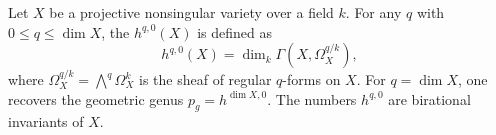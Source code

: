 Let $X$ be a projective nonsingular variety over a field $k$. For any $q$ with $0 \leq q \leq \dim X$, the  $h^{q,0}(X)$ is defined as
$$h^{q,0}(X) = \dim_k \Gamma(X, \Omega_X^{q/k}),$$
where $\Omega_X^{q/k} = \bigwedge^q \Omega_X^{k}$ is the sheaf of regular $q$-forms on $X$. For $q = \dim X$, one recovers the geometric genus $p_g = h^{\dim X, 0}$. The numbers $h^{q,0}$ are birational invariants of $X$.
